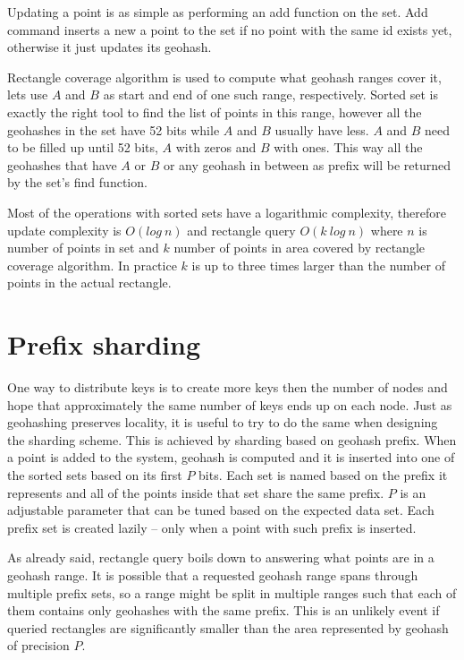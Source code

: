 \documentclass[times, utf8, diplomski]{fer}
\begin{document}
Updating a point is as simple as performing an add function on the set. Add command inserts a new a point to the set if no point with the same id exists yet, otherwise it just updates its geohash.

Rectangle coverage algorithm is used to compute what geohash ranges cover it, lets use $A$ and $B$ as start and end of one such range, respectively. Sorted set is exactly the right tool to find the list of points in this range, however all the geohashes in the set have 52 bits while $A$ and $B$ usually have less. $A$ and $B$ need to be filled up until 52 bits, $A$ with zeros and $B$ with ones. This way all the geohashes that have $A$ or $B$ or any geohash in between as prefix will be returned by the set's find function.

Most of the operations with sorted sets have a logarithmic complexity, therefore update complexity is $O(log\ n)$ and rectangle query $O(k \ log\ n)$ where $n$ is number of points in set and $k$ number of points in area covered by rectangle coverage algorithm. In practice $k$ is up to three times larger than the number of points in the actual rectangle.

\section {Prefix sharding} \label {prefix}
One way to distribute keys is to create more keys then the number of nodes and hope that approximately the same number of keys ends up on each node. Just as geohashing preserves locality, it is useful to try to do the same when designing the sharding scheme. This is achieved by sharding based on geohash prefix. When a point is added to the system, geohash is computed and it is inserted into one of the sorted sets based on its first $P$ bits. Each set is named based on the prefix it represents and all of the points inside that set share the same prefix. $P$ is an adjustable parameter that can be tuned based on the expected data set. Each prefix set is created lazily -- only when a point with such prefix is inserted.

As already said, rectangle query boils down to answering what points are in a geohash range. It is possible that a requested geohash range spans through multiple prefix sets, so a range might be split in multiple ranges such that each of them contains only geohashes with the same prefix. This is an unlikely event if queried rectangles are significantly smaller than the area represented by geohash of precision $P$.
\end{document}
